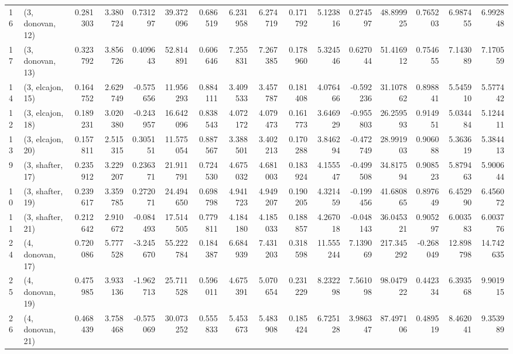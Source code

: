 \begin{tabular}{llrrrrrrrrrrrrrr}
16 &  (3, donovan, 12) &   0.281303 &  3.380724 &  0.731297 &  39.372096 &  0.686519 &   6.231958 &  6.274719 &  0.171792 &   5.123816 &  0.274597 &   48.899925 &  0.765203 &   6.987455 &   6.992848 \\
17 &  (3, donovan, 13) &   0.323792 &  3.856726 &  0.409643 &  52.814891 &  0.606646 &   7.255831 &  7.267385 &  0.178960 &   5.324546 &  0.627044 &   51.416912 &  0.754655 &   7.143089 &   7.170559 \\
14 &  (3, elcajon, 15) &   0.164752 &  2.629749 & -0.575656 &  11.956293 &  0.884111 &   3.409533 &  3.457787 &  0.181408 &   4.076466 & -0.592236 &   31.107862 &  0.898841 &   5.545910 &   5.577442 \\
12 &  (3, elcajon, 18) &   0.189231 &  3.020380 & -0.243957 &  16.642096 &  0.838543 &   4.072172 &  4.079473 &  0.161773 &   3.646929 & -0.955803 &   26.259593 &  0.914951 &   5.034484 &   5.124411 \\
13 &  (3, elcajon, 20) &   0.157811 &  2.515315 &  0.305151 &  11.575054 &  0.887567 &   3.388501 &  3.402213 &  0.170288 &   3.846294 & -0.472749 &   28.991903 &  0.906088 &   5.363619 &   5.384413 \\
9  &  (3, shafter, 17) &   0.235912 &  3.229207 &  0.236371 &  21.911791 &  0.724530 &   4.675032 &  4.681003 &  0.183924 &   4.155547 & -0.499508 &   34.817594 &  0.908523 &   5.879463 &   5.900644 \\
10 &  (3, shafter, 19) &   0.239617 &  3.359785 &  0.272071 &  24.494650 &  0.698798 &   4.941723 &  4.949207 &  0.190205 &   4.321459 & -0.199456 &   41.680865 &  0.897649 &   6.452990 &   6.456072 \\
11 &  (3, shafter, 21) &   0.212642 &  2.910672 & -0.084493 &  17.514505 &  0.779811 &   4.184180 &  4.185033 &  0.188857 &   4.267018 & -0.048143 &   36.045321 &  0.905297 &   6.003583 &   6.003776 \\
24 &  (4, donovan, 17) &   0.720086 &  5.777528 & -3.245670 &  55.222784 &  0.184387 &   6.684939 &  7.431203 &  0.318598 &  11.555244 &  7.139069 &  217.345292 & -0.268049 &  12.898798 &  14.742635 \\
25 &  (4, donovan, 19) &   0.475985 &  3.933136 & -1.962713 &  25.711528 &  0.596011 &   4.675391 &  5.070654 &  0.231229 &   8.232298 &  7.561098 &   98.047922 &  0.442334 &   6.393568 &   9.901915 \\
26 &  (4, donovan, 21) &   0.468439 &  3.758468 & -0.575069 &  30.073252 &  0.555833 &   5.453673 &  5.483908 &  0.185424 &   6.725128 &  3.986347 &   87.497106 &  0.489519 &   8.462041 &   9.353989 \\

\end{tabular}
